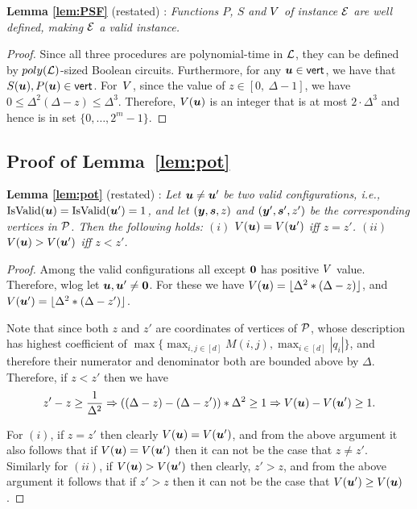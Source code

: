 \textbf{Lemma \ref{lem:PSF}} (restated) : \emph{
Functions $P$, $S$ and $\mbox{$V$}$ of instance $\mbox{${\mathcal E}$}$ are well defined, making $\mbox{${\mathcal E}$}$ a valid \EOPL instance. 
}
\begin{proof}
Since all three procedures are polynomial-time in $\mbox{${\mathcal L}$}$, they can be defined
by $poly(\mbox{${\mathcal L}$})$-sized Boolean circuits. Furthermore, for any $\mbox{\boldmath $u$} \in \operatorname{\mathsf{vert}}$,
we have that $S(\mbox{\boldmath $u$}),P(\mbox{\boldmath $u$}) \in \operatorname{\mathsf{vert}}$. For~$\mbox{$V$}$, 
since the value of $z \in [0,\ \Delta-1]$, we
have $0\le \Delta^2(\Delta-z)\le \Delta^3$. Therefore, $\mbox{$V$}(\mbox{\boldmath $u$})$ is an
integer that is at most $2 \cdot \Delta^3$ and hence is in set $\{0,\dots, 2^m-1\}$. 
\end{proof}

\subsection{Proof of Lemma~\ref{lem:pot}}

\textbf{Lemma \ref{lem:pot}} (restated) : \emph{
Let $\mbox{\boldmath $u$} \neq \mbox{\boldmath $u$}'$ be two valid configurations, i.e.,
	$\mbox{IsValid}(\mbox{\boldmath $u$})=\mbox{IsValid}(\mbox{\boldmath $u$}')=1$, and let $(\mbox{\boldmath $y$},\mbox{\boldmath $s$},z)$ and $(\mbox{\boldmath $y$}',\mbox{\boldmath $s$}',z')$
	be the corresponding vertices in $\mbox{${\mathcal P}$}$. Then the following holds: $(i)$
	$\mbox{$V$}(\mbox{\boldmath $u$})=\mbox{$V$}(\mbox{\boldmath $u$}')$ iff $z=z'$. $(ii)$ $\mbox{$V$}(\mbox{\boldmath $u$})>\mbox{$V$}(\mbox{\boldmath $u$}')$ iff $z<z'$.
}
\begin{proof}
Among the valid configurations all except $\mbox{\boldmath $0$}$ has positive $\mbox{$V$}$ value. Therefore, wlog let $\mbox{\boldmath $u$},\mbox{\boldmath $u$}'\neq \mbox{\boldmath $0$}$. For these we have $\mbox{$V$}(\mbox{\boldmath $u$})=\lfloor \Delta^2*(\Delta -z)\rfloor$, and $\mbox{$V$}(\mbox{\boldmath $u$}')=\lfloor \Delta^2*(\Delta -z')\rfloor$. 

Note that since both $z$ and $z'$ are coordinates of vertices of $\mbox{${\mathcal P}$}$, whose description has highest coefficient of $\max\{\max_{i,j\in [d]} M(i,j),\max_{i\in [d]} |q_i|\}$, and therefore their numerator and denominator both are bounded above by $\Delta$. Therefore, if $z< z'$ then we have 
\[
z'-z\ge \frac{1}{\Delta^2} \Rightarrow ((\Delta-z) - (\Delta - z'))*\Delta^2 \ge 1 \Rightarrow \mbox{$V$}(\mbox{\boldmath $u$})-\mbox{$V$}(\mbox{\boldmath $u$}') \ge 1.
\]

For $(i)$, if $z=z'$ then clearly $\mbox{$V$}(\mbox{\boldmath $u$})=\mbox{$V$}(\mbox{\boldmath $u$}')$, and from the above argument it also follows that if $\mbox{$V$}(\mbox{\boldmath $u$})= \mbox{$V$}(\mbox{\boldmath $u$}')$ then it can not be the case that $z\neq z'$. Similarly for $(ii)$, if $\mbox{$V$}(\mbox{\boldmath $u$})>\mbox{$V$}(\mbox{\boldmath $u$}')$ then clearly, $z'>z$, and from the above argument it follows that if $z'>z$ then it can not be the case that $\mbox{$V$}(\mbox{\boldmath $u$}')\ge \mbox{$V$}(\mbox{\boldmath $u$})$. 
\end{proof}

